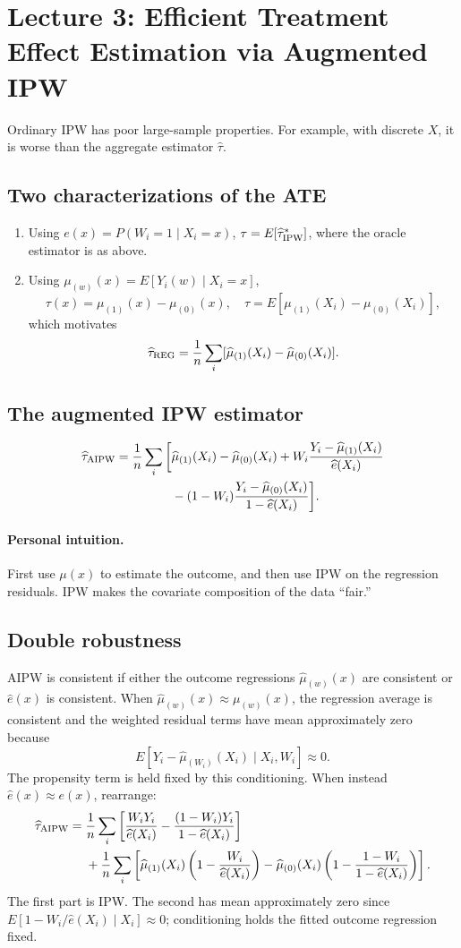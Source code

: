 \section{Lecture 3: Efficient Treatment Effect Estimation via Augmented IPW}
Ordinary IPW has poor large-sample properties. For example, with discrete $X$, it is worse than the aggregate estimator $\widehat\tau$.
\subsection{Two characterizations of the ATE}
\begin{enumerate}
\item Using $e(x)=P(W_i=1\mid X_i=x)$, $\tau=E[\widehat\tau^*_{\rm IPW}]$, where the oracle estimator is as above.
\item Using $\mu_{(w)}(x)=E[Y_i(w)\mid X_i=x]$,
\[
\tau(x)=\mu_{(1)}(x)-\mu_{(0)}(x),\quad
\tau=E[\mu_{(1)}(X_i)-\mu_{(0)}(X_i)],
\]
which motivates
\[
\widehat\tau_{\rm REG}=\frac1n\sum_i[\widehat\mu_{(1)}(X_i)-\widehat\mu_{(0)}(X_i)].
\]
\end{enumerate}
\subsection{The augmented IPW estimator}
\begin{align*}
\widehat\tau_{\rm AIPW}=\frac1n\sum_i\bigg[&\widehat\mu_{(1)}(X_i)-\widehat\mu_{(0)}(X_i)
+W_i\frac{Y_i-\widehat\mu_{(1)}(X_i)}{\widehat e(X_i)}\\
&-(1-W_i)\frac{Y_i-\widehat\mu_{(0)}(X_i)}{1-\widehat e(X_i)}\bigg].
\end{align*}
\paragraph{Personal intuition.}
First use $\mu(x)$ to estimate the outcome, and then use IPW on the regression residuals. IPW makes the covariate composition of the data ``fair.''
\subsection{Double robustness}
AIPW is consistent if either the outcome regressions $\widehat\mu_{(w)}(x)$ are consistent or $\widehat e(x)$ is consistent.
When $\widehat\mu_{(w)}(x)\approx\mu_{(w)}(x)$, the regression average is consistent and the weighted residual terms have mean approximately zero because
\[
E[Y_i-\widehat\mu_{(W_i)}(X_i)\mid X_i,W_i]\approx0.
\]
The propensity term is held fixed by this conditioning. When instead $\widehat e(x)\approx e(x)$, rearrange:
\begin{align*}
\widehat\tau_{\rm AIPW}={}&\frac1n\sum_i\left[\frac{W_iY_i}{\widehat e(X_i)}
-\frac{(1-W_i)Y_i}{1-\widehat e(X_i)}\right]\\
&+\frac1n\sum_i\left[\widehat\mu_{(1)}(X_i)\left(1-\frac{W_i}{\widehat e(X_i)}\right)
-\widehat\mu_{(0)}(X_i)\left(1-\frac{1-W_i}{1-\widehat e(X_i)}\right)\right].
\end{align*}
The first part is IPW. The second has mean approximately zero since
$E[1-W_i/\widehat e(X_i)\mid X_i]\approx0$; conditioning holds the fitted outcome regression fixed.
